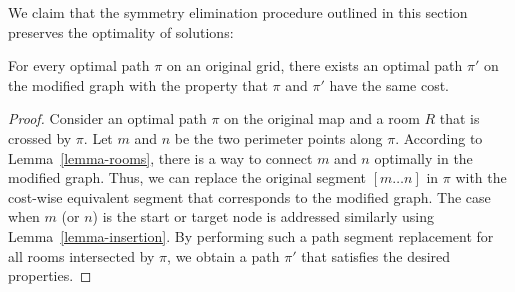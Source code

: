 We claim that the symmetry elimination procedure outlined in this section preserves the optimality of solutions:
\begin{theorem}
For every optimal path $\pi$ on an original grid, there exists an optimal path $\pi'$ on the modified graph with the property
that $\pi$ and $\pi'$ have the same cost.
\end{theorem}
\begin{proof}
Consider an optimal path $\pi$ on the original map and a room $R$ that is crossed by $\pi$.
Let $m$ and $n$ be the two perimeter points along $\pi$. According to Lemma~\ref{lemma-rooms},
there is a way to connect $m$ and $n$ optimally in the modified graph. Thus, we can replace the
original segment $[m \dots n]$ in $\pi$ with the cost-wise equivalent segment that corresponds to the modified graph.
The case when $m$ (or $n$) is the start or target node is addressed similarly using Lemma~\ref{lemma-insertion}.
By performing such a path segment replacement for all rooms intersected by $\pi$, we obtain a path $\pi'$
that satisfies the desired properties.
\end{proof}


